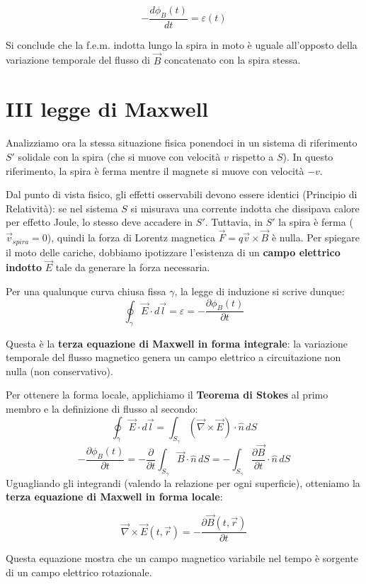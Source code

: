 \documentclass{book}
\begin{document}
$$-\frac{d \phi_B (t)}{dt} = \varepsilon(t)$$

Si conclude che la f.e.m. indotta lungo la spira in moto è uguale all'opposto della variazione temporale del flusso di $\vec{B}$ concatenato con la spira stessa.

\section{III legge di Maxwell}

Analizziamo ora la stessa situazione fisica ponendoci in un sistema di riferimento $S'$ solidale con la spira (che si muove con velocità $v$ rispetto a $S$). In questo riferimento, la spira è ferma mentre il magnete si muove con velocità $-v$.

Dal punto di vista fisico, gli effetti osservabili devono essere identici (Principio di Relatività): se nel sistema $S$ si misurava una corrente indotta che dissipava calore per effetto Joule, lo stesso deve accadere in $S'$.
Tuttavia, in $S'$ la spira è ferma ($\vec{v}_{spira}=0$), quindi la forza di Lorentz magnetica $\vec{F} = q\vec{v}\times\vec{B}$ è nulla. Per spiegare il moto delle cariche, dobbiamo ipotizzare l'esistenza di un \textbf{campo elettrico indotto} $\vec{E}$ tale da generare la forza necessaria.

Per una qualunque curva chiusa fissa $\gamma$, la legge di induzione si scrive dunque:
$$\boxed{ \oint_{\gamma} \vec{E}\cdot d\vec{l} =\varepsilon = -\frac{\partial \phi_B(t)}{\partial t}}$$

Questa è la \textbf{terza equazione di Maxwell in forma integrale}: la variazione temporale del flusso magnetico genera un campo elettrico a circuitazione non nulla (non conservativo).

Per ottenere la forma locale, applichiamo il \textbf{Teorema di Stokes} al primo membro e la definizione di flusso al secondo:
$$
\oint_{\gamma} \vec{E}\cdot d\vec{l} = \int_{S_{\gamma}} (\vec{\nabla}\times \vec{E})\cdot\hat{n} \, dS
$$
$$
-\frac{\partial \phi_B(t)}{\partial t} = -\frac{\partial}{\partial t} \int_{S_{\gamma}} \vec{B}\cdot \hat{n} \, dS = - \int_{S_{\gamma}} \frac{\partial \vec{B}}{\partial t}\cdot \hat{n} \, dS
$$
Uguagliando gli integrandi (valendo la relazione per ogni superficie), otteniamo la \textbf{terza equazione di Maxwell in forma locale}:

$$\boxed{\vec{\nabla}\times \vec{E}(t,\vec{r}) = -\frac{\partial \vec{B}(t,\vec{r})}{\partial t}}$$

Questa equazione mostra che un campo magnetico variabile nel tempo è sorgente di un campo elettrico rotazionale.
\end{document}
